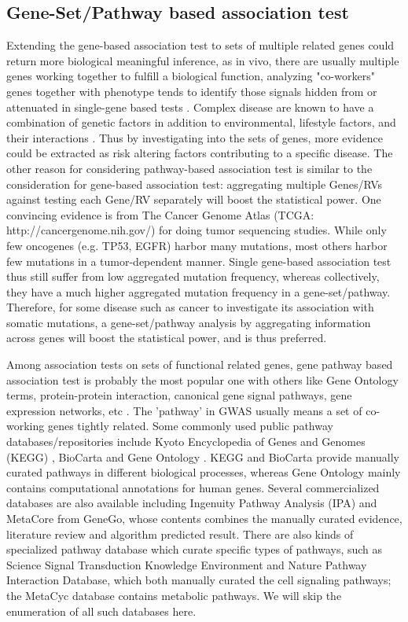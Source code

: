 \documentclass[12pt]{article}
\begin{document}
\subsection*{Gene-Set/Pathway based association test}
Extending the gene-based association test to sets of multiple related genes could return more biological meaningful inference, as in vivo, there are usually multiple genes working together to fulfill a biological function, analyzing "co-workers" genes together with phenotype tends to identify those signals hidden from or attenuated in single-gene based tests \cite{BloodPressureGenome-WideAssociationStudies2011,Hirschhorn2009,Zhong2010,Wang2010}. Complex disease are known to have a combination of genetic factors in addition to environmental, lifestyle factors, and their interactions \cite{Hirschhorn2005,McCarthy2008}. Thus by investigating into the sets of genes, more evidence could be extracted as risk altering factors contributing to a specific disease. The other reason for considering pathway-based association test is similar to the consideration for gene-based association test: aggregating multiple Genes/RVs against testing each Gene/RV separately will boost the statistical power. One convincing evidence is from The Cancer Genome Atlas (TCGA: http://cancergenome.nih.gov/) for doing tumor sequencing studies. While only few oncogenes (e.g. TP53, EGFR) harbor many mutations, most others harbor few mutations in a tumor-dependent manner. Single gene-based association test thus still suffer from low aggregated mutation frequency, whereas collectively, they have a much higher aggregated mutation frequency in a gene-set/pathway. Therefore, for some disease such as cancer to investigate its association with somatic mutations, a gene-set/pathway analysis by aggregating information across genes will boost the statistical power, and is thus preferred.

Among association tests on sets of functional related genes, gene pathway based association test is probably the most popular one \cite{DelaCruz2010,Wang2010} with others like Gene Ontology terms, protein-protein interaction, canonical gene signal pathways, gene expression networks, etc \cite{Sham2014,DelaCruz2010,Weng2011,Wang2010} . The 'pathway' in GWAS usually means a set of co-working genes tightly related. Some commonly used public pathway databases/repositories include Kyoto Encyclopedia of Genes and Genomes (KEGG) \cite{Ogata1999}, BioCarta \cite{Nishimura2001} and Gene Ontology \cite{Ashburner2000}. KEGG and BioCarta provide manually curated pathways in different biological processes, whereas Gene Ontology mainly contains computational annotations for human genes. Several commercialized databases are also available including Ingenuity Pathway Analysis (IPA) and MetaCore from GeneGo, whose contents combines the manually curated evidence, literature review and algorithm predicted result. There are also kinds of specialized pathway database which curate specific types of pathways, such as Science Signal Transduction Knowledge Environment and Nature Pathway Interaction Database, which both manually curated the cell signaling pathways; the MetaCyc database contains metabolic pathways. We will skip the enumeration of all such databases here. 
\end{document}
